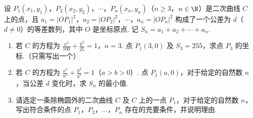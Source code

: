 \begin{problem}
设 \(P_{1}(x_{1},y_{1})\)，\(P_{2}(x_{2},y_{2})\)，\(\cdots\)，\(P_{n}(x_{n},y_{n})\)（\(n \geqslant 3\)，\(n \in \N\)）是二次曲线 \(C\) 上的点，且 \(a_{1} = |OP_{1}|^{2}\)，\(a_{2} = |OP_{2}|^{2}\)，\(\cdots\)，\(a_{n} = |OP_{n}|^{2}\) 构成了一个公差为 \(d\)（\(d \neq 0\)）的等差数列，其中 \(O\) 是坐标原点. 记 \(S_{n} = a_{1} + a_{2} + \cdots + a_{n}\).

\begin{enumerate}
\item 若 \(C\) 的方程为 \(\frac{x^2}{100} + \frac{y^2}{25} = 1\)，\(n = 3\). 点 \(P_1(3,0)\) 及 \(S_3 = 255\)，求点 \(P_3\) 的坐标.（只需写出一个）
\item 若 \(C\) 的方程为 \(\frac{x^2}{a^2} + \frac{y^2}{b^2} = 1\)（\(a > b > 0\)）. 点 \(P_1(a,0)\)，对于给定的自然数 \(n\)，当公差 \(d\) 变化时，求 \(S_n\) 的最小值.

\item 请选定一条除椭圆外的二次曲线 \(C\) 及 \(C\) 上的一点 \(P_1\)，对于给定的自然数 \(n\)，写出符合条件的点 \(P_1\)，\(P_2\)，\(\ldots\)，\(P_n\) 存在的充要条件，并说明理由.
\end{enumerate}
\end{problem}

